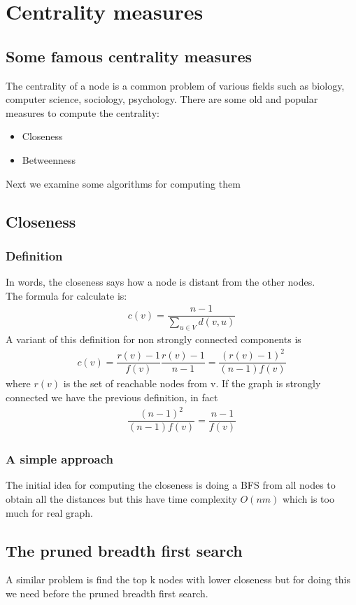 \chapter{Centrality measures}
\section{Some famous centrality measures}
The centrality of a node is a common problem of various fields such as biology, computer science, sociology, psychology. There are some old and popular measures to compute the centrality:
\begin{itemize}
	\item Closeness
	\item Betweenness
\end{itemize}
Next we examine some algorithms for computing them
\section{Closeness}
\subsection{Definition}
In words, the closeness says how a node is distant from the other nodes.\\
The formula for calculate is:
\begin{align*}
c(v) = \dfrac{n-1}{\sum_{u \in V} d(v,u)}
\end{align*}
A variant of this definition for non strongly connected components is
\begin{align*}
c(v)  = \dfrac{r(v) -1}{f(v)} \dfrac{r(v)-1}{n-1} = \dfrac{(r(v) - 1)^2}{(n-1)f(v)}
\end{align*}
 where $ r(v) $ is the set of reachable nodes from v. If the graph is strongly connected we have the previous definition, in fact
 \begin{align*}
 	\dfrac{(n - 1)^2}{(n-1)f(v)} = \dfrac{n-1}{f(v)}
 \end{align*}
 \subsection{A simple approach}
 The initial idea for computing the closeness is doing a BFS from all nodes to obtain all the distances but this have time complexity $ O(nm) $ which is too much for real graph.
 \section*{The pruned breadth first search}
  A similar problem is find the top k nodes with lower closeness but for doing this we need before the pruned breadth first search.\\
